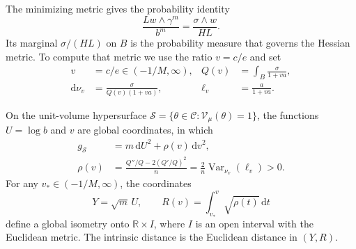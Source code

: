 The minimizing metric gives the probability identity
\begin{equation}\label{eq:warped-minimizer-trace}
 \frac{Lw\wedge\gamma^m}{b^m}
       =\frac{\sigma\wedge w}{HL}.
\end{equation}
Its marginal $\sigma/(HL)$ on $B$ is the probability measure that governs the Hessian metric. To compute that metric we use the ratio $v=c/e$ and set
\begin{align*}
 v&=c/e\in(-1/M,\infty),
 &Q(v)&=\int_B\frac{\sigma}{1+va},\\
 \mathrm{d}\nu_v&=\frac{\sigma}{Q(v)(1+va)},
 &\ell_v&=\frac{a}{1+va}.
\end{align*}

\begin{proposition}\label{prop:warped-flat-unit-metric}
On the unit-volume hypersurface $\mathscr S=\{\theta\in\mathscr C:\mathcal V_\mu(\theta)=1\}$, the functions $U=\log b$ and $v$ are global coordinates, in which
\begin{equation}\label{eq:warped-flat-unit-metric}
 \begin{aligned}
 g_{\mathscr S}&=m\,\mathrm{d}U^2+\rho(v)\,\mathrm{d}v^2,\\
 \rho(v)&=\frac{Q''/Q-2(Q'/Q)^2}{n}
       =\frac2n\operatorname{Var}_{\nu_v}(\ell_v)>0.
 \end{aligned}
\end{equation}
For any $v_*\in(-1/M,\infty)$, the coordinates
\[
 Y=\sqrt m\,U,\qquad
 R(v)=\int_{v_*}^v\sqrt{\rho(t)}\,\mathrm{d}t
\]
define a global isometry onto $\mathbb R\times I$, where $I$ is an open interval with the Euclidean metric. The intrinsic distance is the Euclidean distance in $(Y,R)$.
\end{proposition}
